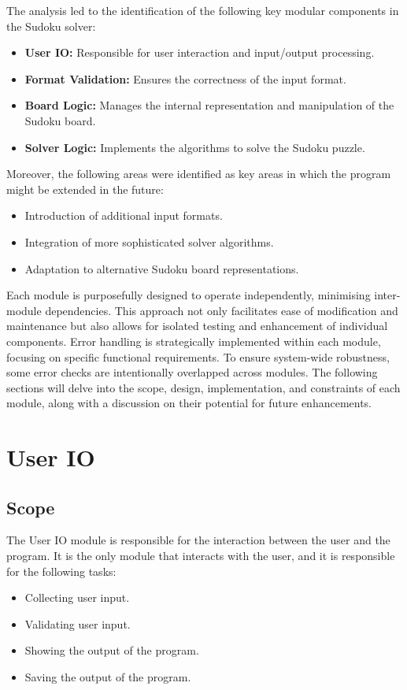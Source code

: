 \documentclass[11pt]{article}
\begin{document}
The analysis led to the identification of the following key modular components in the Sudoku solver:

\begin{itemize}
\item \textbf{User IO:} Responsible for user interaction and input/output processing.
\item \textbf{Format Validation:} Ensures the correctness of the input format.
\item \textbf{Board Logic:} Manages the internal representation and manipulation of the Sudoku board.
\item \textbf{Solver Logic:} Implements the algorithms to solve the Sudoku puzzle.
\end{itemize}

Moreover, the following areas were identified as key areas in which the program might be extended in the future:
\begin{itemize}
\item Introduction of additional input formats.
\item Integration of more sophisticated solver algorithms.
\item Adaptation to alternative Sudoku board representations.
\end{itemize}

Each module is purposefully designed to operate independently, minimising inter-module dependencies. This approach not only facilitates ease of modification and maintenance but also allows for isolated testing and enhancement of individual components. Error handling is strategically implemented within each module, focusing on specific functional requirements. To ensure system-wide robustness, some error checks are intentionally overlapped across modules. The following sections will delve into the scope, design, implementation, and constraints of each module, along with a discussion on their potential for future enhancements.
\section{User IO}
\subsection{Scope}
The User IO module is responsible for the interaction between the user and the program. It is the only module that interacts with the user, and it is responsible for the following tasks:
\begin{itemize}
    \item Collecting user input.
    \item Validating user input.
    \item Showing the output of the program.
    \item Saving the output of the program.
\end{itemize}
\end{document}
